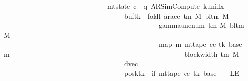 \begin{isabellebody}
\ \ \ \ \ \ \ \ \ \ \ \ \ \ \ \ \ \ \ \ \ \ \ \ \ \ \ \ \ {\isasymand}\ mt{\isacharunderscore}{\kern0pt}state\ c{\isacharprime}{\kern0pt}{\isacharprime}{\kern0pt}\ {\isacharequal}{\kern0pt}\ {\isacharparenleft}{\kern0pt}q{\isacharcomma}{\kern0pt}\ AR{\isacharunderscore}{\kern0pt}SimCompute{\isacharcomma}{\kern0pt}\ k{\isacharunderscore}{\kern0pt}unidx\ {}{\isacharcomma}{\kern0pt}\ {}{\isacharcomma}{\kern0pt}\isanewline
\ \ \ \ \ \ \ \ \ \ \ \ \ \ \ \ \ \ \ \ \ \ \ \ \ \ \ \ \ \ \ \ \ \ \ buf{\isacharparenleft}{\kern0pt}tk\ {\isacharcolon}{\kern0pt}{\isacharequal}{\kern0pt}\ foldl\ {\isacharparenleft}{\kern0pt}ar{\isacharunderscore}{\kern0pt}acc\ {\isacharparenleft}{\kern0pt}{\isasymGamma}{\isacharunderscore}{\kern0pt}tm\ M{\isacharparenright}{\kern0pt}\ {\isacharparenleft}{\kern0pt}bl{\isacharunderscore}{\kern0pt}tm\ M{\isacharparenright}{\kern0pt}{\isacharparenright}{\kern0pt}\isanewline
\ \ \ \ \ \ \ \ \ \ \ \ \ \ \ \ \ \ \ \ \ \ \ \ \ \ \ \ \ \ \ \ \ \ \ \ \ \ \ \ \ \ \ \ \ {\isacharparenleft}{\kern0pt}gamma{\isacharunderscore}{\kern0pt}unenum\ {\isacharparenleft}{\kern0pt}{\isasymGamma}{\isacharunderscore}{\kern0pt}tm\ M{\isacharparenright}{\kern0pt}\ {\isacharparenleft}{\kern0pt}bl{\isacharunderscore}{\kern0pt}tm\ M{\isacharparenright}{\kern0pt}\ {}{\isacharparenright}{\kern0pt}\isanewline
\ \ \ \ \ \ \ \ \ \ \ \ \ \ \ \ \ \ \ \ \ \ \ \ \ \ \ \ \ \ \ \ \ \ \ \ \ \ \ \ \ \ \ \ \ {\isacharparenleft}{\kern0pt}map\ {\isacharparenleft}{\kern0pt}{\isasymlambda}m{\isachardot}{\kern0pt}\ mt{\isacharunderscore}{\kern0pt}tape\ cc\ tk\ {\isacharparenleft}{\kern0pt}base{\isacharprime}{\kern0pt}\ {\isacharplus}{\kern0pt}\ m{\isacharparenright}{\kern0pt}{\isacharparenright}{\kern0pt}\isanewline
\ \ \ \ \ \ \ \ \ \ \ \ \ \ \ \ \ \ \ \ \ \ \ \ \ \ \ \ \ \ \ \ \ \ \ \ \ \ \ \ \ \ \ \ \ \ \ \ \ \ {\isacharbrackleft}{\kern0pt}{}{\isachardot}{\kern0pt}{\isachardot}{\kern0pt}{\isacharless}{\kern0pt}block{\isacharunderscore}{\kern0pt}width\ {\isacharparenleft}{\kern0pt}{\isasymGamma}{\isacharunderscore}{\kern0pt}tm\ M{\isacharparenright}{\kern0pt}{\isacharbrackright}{\kern0pt}{\isacharparenright}{\kern0pt}{\isacharparenright}{\kern0pt}{\isacharcomma}{\kern0pt}\isanewline
\ \ \ \ \ \ \ \ \ \ \ \ \ \ \ \ \ \ \ \ \ \ \ \ \ \ \ \ \ \ \ \ \ \ \ dvec{\isacharcomma}{\kern0pt}\isanewline
\ \ \ \ \ \ \ \ \ \ \ \ \ \ \ \ \ \ \ \ \ \ \ \ \ \ \ \ \ \ \ \ \ \ \ posk{\isacharparenleft}{\kern0pt}tk\ {\isacharcolon}{\kern0pt}{\isacharequal}{\kern0pt}\ if\ mt{\isacharunderscore}{\kern0pt}tape\ cc\ tk\ {\isacharparenleft}{\kern0pt}base{\isacharprime}{\kern0pt}\ {\isacharminus}{\kern0pt}\ {}{\isacharparenright}{\kern0pt}\ {\isacharequal}{\kern0pt}\ LE{}\isanewline

\end{isabellebody}
